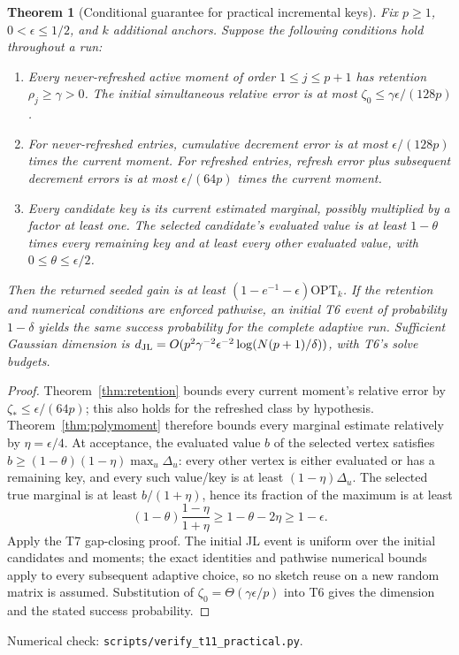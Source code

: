 \documentclass[11pt]{article}
\newtheorem{theorem}{Theorem}
\begin{document}
\begin{theorem}[Conditional guarantee for practical incremental keys]
\label{thm:practicalinc}
Fix $p\geq1$, $0<\epsilon\leq1/2$, and $k$ additional anchors.
Suppose the following conditions hold throughout a run:
\begin{enumerate}
\item Every never-refreshed active moment of order $1\leq j\leq p+1$
has retention $\rho_j\geq\gamma>0$. The initial simultaneous
relative error is at most $\zeta_0\leq\gamma\epsilon/(128p)$.
\item For never-refreshed entries, cumulative decrement error is
at most $\epsilon/(128p)$ times the current moment. For refreshed
entries, refresh error plus subsequent decrement errors is at
most $\epsilon/(64p)$ times the current moment.
\item Every candidate key is its current estimated marginal,
possibly multiplied by a factor at least one. The selected
candidate's evaluated value is at least $1-\theta$ times every
remaining key and at least every other evaluated value, with
$0\leq\theta\leq\epsilon/2$.
\end{enumerate}
Then the returned seeded gain is at least
$(1-e^{-1}-\epsilon)\mathrm{OPT}_k$.
If the retention and numerical conditions are enforced pathwise,
an initial T6 event of probability $1-\delta$ yields the same
success probability for the complete adaptive run. Sufficient
Gaussian dimension is
$d_{\rm JL}=O(p^2\gamma^{-2}\epsilon^{-2}
\log(N(p+1)/\delta))$, with T6's solve budgets.
\end{theorem}
\begin{proof}
Theorem~\ref{thm:retention} bounds every current moment's relative
error by $\zeta_*\leq\epsilon/(64p)$; this also holds for the
refreshed class by hypothesis. Theorem~\ref{thm:polymoment}
therefore bounds every marginal estimate relatively by
$\eta=\epsilon/4$. At acceptance, the evaluated value $b$ of the
selected vertex satisfies
$b\geq(1-\theta)(1-\eta)\max_u\Delta_u$:
every other vertex is either evaluated or has a remaining key,
and every such value/key is at least $(1-\eta)\Delta_u$.
The selected true marginal is at least $b/(1+\eta)$, hence
its fraction of the maximum is at least
\[
 (1-\theta)\frac{1-\eta}{1+\eta}
 \geq1-\theta-2\eta\geq1-\epsilon.
\]
Apply the T7 gap-closing proof. The initial JL event is uniform
over the initial candidates and moments; the exact identities and
pathwise numerical bounds apply to every subsequent adaptive
choice, so no sketch reuse on a new random matrix is assumed.
Substitution of $\zeta_0=\Theta(\gamma\epsilon/p)$ into T6
gives the dimension and the stated success probability.
\end{proof}
\noindent Numerical check: \texttt{scripts/verify\_t11\_practical.py}.
\end{document}
